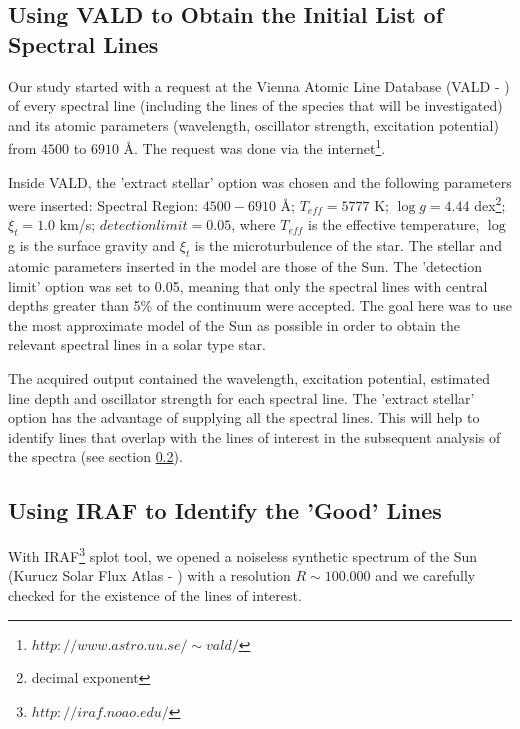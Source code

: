 \documentclass[dvips,12pt,a4paper]{report}
\begin{document}
{\subsection {Using VALD to Obtain the Initial List of Spectral Lines}
\label{VALD}
Our study started with a request at the Vienna Atomic Line Database (VALD - \citeauthor{Kupka-1999} \citeyear{Kupka-1999})  of every spectral line (including the lines of the species that will be investigated) and its atomic parameters (wavelength, oscillator strength, excitation potential) %
from $4500$ to $6910$ \AA. The request was done via the internet\footnote{$http://www.astro.uu.se/\sim vald/$}. %

Inside VALD, the 'extract stellar' option was chosen and the following parameters were inserted: Spectral Region: $4500-6910$ \AA ; $T_{eff}=5777$ K; $\log g=4.44$ dex\footnote{decimal exponent}; $\xi_t=1.0$ km/s; $detection limit=0.05$, where $T_{eff}$ is the effective temperature, $\log$ g is the surface gravity and $\xi_t$ is the microturbulence of the star. The stellar and atomic parameters inserted in the model are those of the Sun. The 'detection limit' option was set to 0.05, meaning that only the spectral lines with central depths greater than 5\% of the continuum were accepted. The goal here was to use the most approximate model of the Sun as possible in order to obtain the relevant spectral lines in a solar type star. 

The acquired output contained the wavelength, excitation potential, estimated line depth and oscillator strength for each spectral line. The 'extract stellar' option has the advantage of supplying all the spectral lines. This will help to identify lines that overlap with the lines of interest in the subsequent analysis of the spectra (see section \ref{idiraf}).


\subsection {Using IRAF to Identify the 'Good' Lines}
\label{idiraf}
With IRAF\footnote{$http://iraf.noao.edu/$} splot tool, we opened a noiseless synthetic spectrum of the Sun (Kurucz Solar Flux Atlas - \citet{Kurucz-1984} ) with a resolution $R\sim100.000$ and we carefully checked for the existence of the lines of interest.

}
\end{document}
